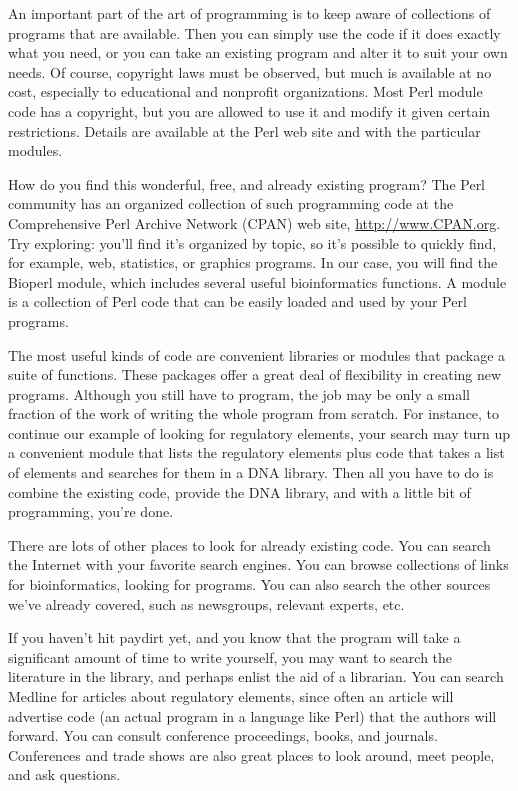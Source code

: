 An important part of the art of programming is to keep aware of collections of programs that are available. Then you can simply use the code if it does exactly what you need, or you can take an existing program and alter it to suit your own needs. Of course, copyright laws must be observed, but much is available at no cost, especially to educational and nonprofit organizations. Most Perl module code has a copyright, but you are allowed to use it and modify it given certain restrictions. Details are available at the Perl web site and with the particular modules.

How do you find this wonderful, free, and already existing program? The Perl community has an organized collection of such programming code at the Comprehensive Perl Archive Network (CPAN) web site, \href{http://www.CPAN.org}{http://www.CPAN.org}. Try exploring: you'll find it's organized by topic, so it's possible to quickly find, for example, web, statistics, or graphics programs. In our case, you will find the Bioperl module, which includes several useful bioinformatics functions. A module is a collection of Perl code that can be easily loaded and used by your Perl programs.

The most useful kinds of code are convenient libraries or modules that package a suite of functions. These packages offer a great deal of flexibility in creating new programs. Although you still have to program, the job may be only a small fraction of the work of writing the whole program from scratch. For instance, to continue our example of looking for regulatory elements, your search may turn up a convenient module that lists the regulatory elements plus code that takes a list of elements and searches for them in a DNA library. Then all you have to do is combine the existing code, provide the DNA library, and with a little bit of programming, you're done.

There are lots of other places to look for already existing code. You can search the Internet with your favorite search engines. You can browse collections of links for bioinformatics, looking for programs.  You can also search the other sources we've already covered, such as newsgroups, relevant experts, etc.

If you haven't hit paydirt yet, and you know that the program will take a significant amount of time to write yourself, you may want to search the literature in the library, and perhaps enlist the aid of a librarian. You can search Medline for articles about regulatory elements, since often an article will advertise code (an actual program in a language like Perl) that the authors will forward. You can consult conference proceedings, books, and journals. Conferences and trade shows are also great places to look around, meet people, and ask questions.


